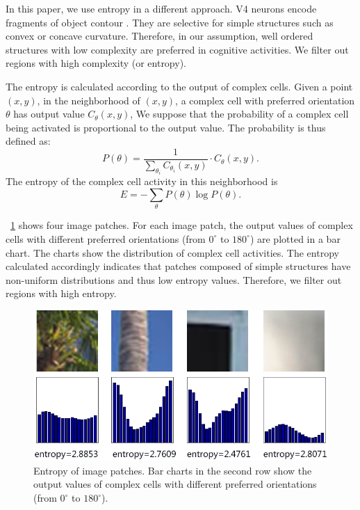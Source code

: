 \documentclass[conference]{IEEEtran}
\begin{document}
In this paper, we use entropy in a different approach.
V4 neurons encode fragments of object contour \cite{pasupathy2001,pasupathy2002}.
They are selective for simple structures such as convex or concave curvature.
Therefore, in our assumption, 
well ordered structures with low complexity are preferred in cognitive activities.
We filter out regions with high complexity (or entropy).

The entropy is calculated according to the output of complex cells.
Given a point $(x,y)$, in the neighborhood of $(x,y)$,
a complex cell with preferred orientation $\theta$ has output value $C_{\theta}(x,y)$,
We suppose that the probability of a complex cell being activated
is proportional to the output value.
The probability is thus defined as:
\begin{equation}
P(\theta)=\frac{1}{\sum_{\theta_i} C_{\theta_i}(x,y)}\cdot C_{\theta}(x,y).
\end{equation}
The entropy of the complex cell activity in this neighborhood
is 
\begin{equation}
E=-\sum_{\theta} P(\theta) \log P(\theta).
\end{equation}

\figurename~\ref{fig:4} shows four image patches.
For each image patch, the output values of complex cells with different preferred orientations
(from $0^\circ$ to $180^\circ$) are plotted in a bar chart.
The charts show the distribution of complex cell activities.
The entropy calculated accordingly indicates that 
patches composed of simple structures have non-uniform distributions and thus low entropy values.
Therefore, we filter out regions with high entropy.

\begin{figure}[htp]
\centerline{\includegraphics[width=0.8\linewidth]{images/fig4.png}} 
\caption{Entropy of image patches.
Bar charts in the second row show the output values of complex cells
with different preferred orientations (from $0^\circ$ to $180^\circ$).}
\label{fig:4}
\end{figure}
\end{document}
